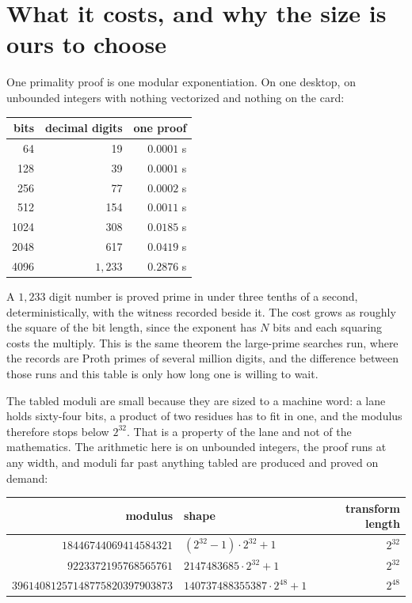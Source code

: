 \documentclass{article}
\begin{document}
\section{What it costs, and why the size is ours to choose}

One primality proof is one modular exponentiation. On one desktop, on unbounded integers with nothing vectorized and nothing on the card:

\begin{center}
\begin{tabular}{@{}rrr@{}}
\toprule
bits & decimal digits & one proof \\
\midrule
64 & 19 & \(0.0001\) s \\
128 & 39 & \(0.0001\) s \\
256 & 77 & \(0.0002\) s \\
512 & 154 & \(0.0011\) s \\
1024 & 308 & \(0.0185\) s \\
2048 & 617 & \(0.0419\) s \\
4096 & \(1{,}233\) & \(0.2876\) s \\
\bottomrule
\end{tabular}
\end{center}

A \(1{,}233\) digit number is proved prime in under three tenths of a second, deterministically, with the witness recorded beside it. The cost grows as roughly the square of the bit length, since the exponent has \(N\) bits and each squaring costs the multiply. This is the same theorem the large-prime searches run, where the records are Proth primes of several million digits, and the difference between those runs and this table is only how long one is willing to wait.

The tabled moduli are small because they are sized to a machine word: a lane holds sixty-four bits, a product of two residues has to fit in one, and the modulus therefore stops below \(2^{32}\). That is a property of the lane and not of the mathematics. The arithmetic here is on unbounded integers, the proof runs at any width, and moduli far past anything tabled are produced and proved on demand:

\begin{center}
\begin{tabular}{@{}rlr@{}}
\toprule
modulus & shape & transform length \\
\midrule
\(18446744069414584321\) & \((2^{32}-1) \cdot 2^{32} + 1\) & \(2^{32}\) \\
\(9223372195768565761\) & \(2147483685 \cdot 2^{32} + 1\) & \(2^{32}\) \\
\(39614081257148775820397903873\) & \(140737488355387 \cdot 2^{48} + 1\) & \(2^{48}\) \\
\bottomrule
\end{tabular}
\end{center}
\end{document}

